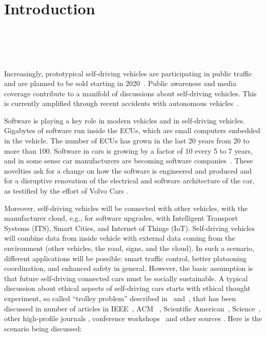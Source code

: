 \section{Introduction}

\\
\\
\\
\\

Increasingly, prototypical self-driving vehicles are participating in public traffic~\cite{Persson2014} and are planned to be sold starting in 2020~\cite{Toyota2015,Stoll_WSJ_2016}. Public awareness and media coverage contribute to a manifold of discussions about self-driving vehicles. This is currently amplified through recent accidents with autonomous vehicles~\cite{Tesla2016_tragicloss,Dolgov2016}. 

Software is playing a key role in modern vehicles and in self-driving vehicles. Gigabytes of software run inside the \acp{ECU}, which are small computers embedded in the vehicle. The number of \acp{ECU} has grown in the last 20 years from 20 to more than 100. Software in cars is growing by a factor of 10 every 5 to 7 years, and in some sense car manufacturers are becoming software companies~\cite{PELLICCIONE201783}. These novelties ask for a change on how the software is engineered and produced and for a disruptive renovation of the electrical and software architecture of the car, as testified by the effort of Volvo Cars \cite{PELLICCIONE201783}.

Moreover, self-driving vehicles will be connected with other vehicles, with the manufacturer cloud, e.g., for software upgrades, with Intelligent Transport Systems (ITS), Smart Cities, and Internet of Things (IoT). Self-driving vehicles will combine data from inside vehicle with external data coming from the environment (other vehicles, the road, signs, and the cloud). In such a scenario, different applications will be possible: smart traffic control, better platooning coordination, and enhanced safety in general.
However, the basic assumption is that future self-driving connected cars must be socially sustainable.
A typical discussion about ethical aspects of self-driving cars starts with ethical thought experiment, so called \enquote{trolley problem} described in~\cite{Foot1967} and~\cite{Wintersberger2017}, that has been discussed in number of articles in IEEE~\cite{7948873,Goodall2016,Ackerman2016}, ACM~ \cite{McBride:2016:EDC:2874239.2874265,Kirkpatrick:2015:MCD:2808213.2788477,Frison:2016:FPT:3004323.3004336}, Scientific American~\cite{Greenemeier2016,Deamer2016,Kuchinskas2013}, Science~\cite{Bonnefon2016,Greene2016_1514}, other high-profile journals \cite{2016arXiv160608813G_GoodmanFlaxman, Coca-Vila2017}, conference workshops~\cite{Riener:2016:WEI:3004323.3005687,Alavi:2017:DCW:3064857.3079155} and other sources \cite{MoralMachine2016,Mooney2016,Achenbach2015}. Here is the scenario being discussed:

